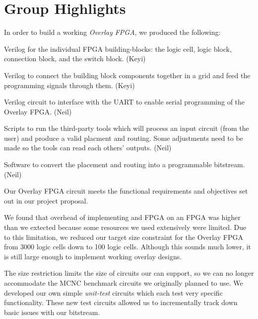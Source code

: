 \section*{Group Highlights}

In order to build a working \emph{Overlay FPGA}, we produced the following:
\begin{itemlist}
\item Verilog for the individual FPGA building-blocks: the logic cell, logic block, connection block, and the switch block. (Keyi)
\item Verilog to connect the building block components together in a grid and feed the programming signals through them. (Keyi)
\item Verilog circuit to interface with the UART to enable serial programming of the Overlay FPGA. (Neil)
\item Scripts to run the third-party tools which will process an input circuit (from the user) and produce a valid placment and routing. Some adjustments need to be made so the tools can read each others' outputs. (Neil)
\item Software to convert the placement and routing into a programmable bitstream. (Neil)
\end{itemlist}

Our Overlay FPGA circuit meets the functional requirements and objectives set out in our project proposal.

We found that overhead of implementing and FPGA on an FPGA was higher than we extected because some resources we used extensively were limited.
Due to this limitation, we reduced our target size constraint for the Overlay FPGA from 3000 logic cells down to 100 logic cells. %
Although this sounds much lower, it is still large enough to implement working overlay designs.

The size restriction limits the size of circuits our \overlay can support, so we can no longer accommodate the MCNC benchmark circuits we originally planned to use.
We developed our own simple \emph{unit-test} circuits which each test very specific functionality.
These new test circuits allowed us to incrementally track down basic issues with our bitstream.


